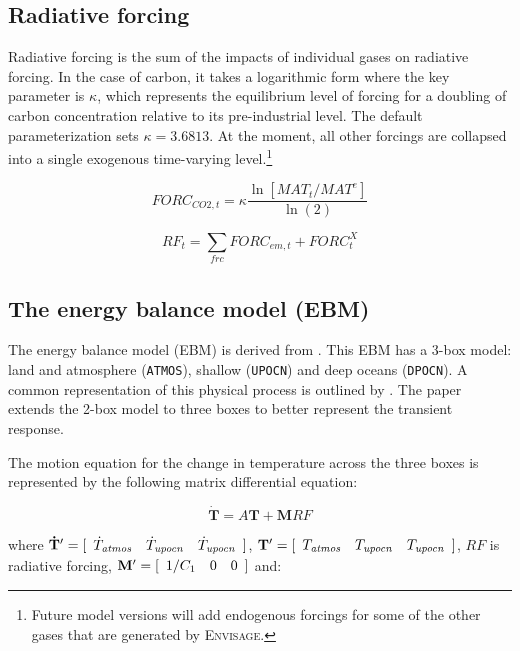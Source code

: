 \subsection{Radiative forcing}

Radiative forcing is the sum of the impacts of individual gases on radiative forcing.
In the case of carbon, it takes a logarithmic form where the key parameter is
$\kappa$, which represents the equilibrium level of forcing for a doubling of carbon
concentration relative to its pre-industrial level. The default
parameterization sets $\kappa=3.6813$. At the moment, all other forcings
are collapsed into a single exogenous time-varying level.\footnote{Future model
versions will add endogenous forcings for some of the other gases that
are generated by \textsc{Envisage}.}

\begin{equation}
\mathit{FORC}_{\mathit{CO2},t} = \kappa \frac{\ln\left[\mathit{MAT}_t/\mathit{MAT}^e \right]}{\ln(2)}
\end{equation}


\begin{equation}
\mathit{RF}_{t} = \sum_{\mathit{frc}}{\mathit{FORC}_{\mathit{em},t}} +  \mathit{FORC}^X_{t}
\end{equation}

\subsection{The energy balance model (EBM)}

The energy balance model (EBM) is derived from \cite{LeachetalFAIR2_0GeoModDev2020}.
This EBM has a 3-box model: land and atmosphere (\texttt{ATMOS}), shallow (\texttt{UPOCN}) and deep oceans (\texttt{DPOCN}).
A common representation
of this physical process is outlined by \cite{GeoffroyetalJClim2013A}. 
The \cite{LeachetalFAIR2_0GeoModDev2020} paper extends the 2-box model
to three boxes to better represent the transient response.

The motion equation for the change in temperature across the three
boxes is represented by the following matrix differential equation:

\[
\mathbf{\dot T} = A \mathbf{T} + \mathbf{M} \mathit{RF}
\]

\noindent where $\mathbf{\dot T}'=[\begin{array}{c c c } \dot T_{\mathit{atmos}} & \dot T_{\mathit{upocn}} & \dot T_{\mathit{upocn}}\end{array}]$,
$\mathbf{T'} = [\begin{array}{c c c } T_{\mathit{atmos}} & T_{\mathit{upocn}} & T_{\mathit{upocn}}\end{array}]$, $\mathit{RF}$ is radiative
forcing, $\mathbf{M'} = [\begin{array}{c c c } 1/C_1 & 0 & 0\end{array}]$ and:

